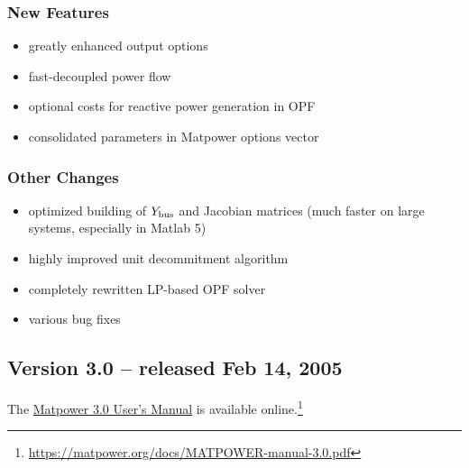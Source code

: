 \documentclass[12pt]{article}
\newcommand{\matlab}[0]{{\sc Matlab}}
\newcommand{\matpower}[0]{{\sc Matpower}}
\numberwithin{equation}{section}
\numberwithin{table}{section}
\numberwithin{figure}{section}
\begin{document}
\begin{appendices}
\subsubsection*{New Features}
\begin{itemize}
\item greatly enhanced output options
\item fast-decoupled power flow
\item optional costs for reactive power generation in OPF
\item consolidated parameters in \matpower{} options vector
\end{itemize}

\subsubsection*{Other Changes}
\begin{itemize}
\item optimized building of $Y_{\rm bus}$ and Jacobian matrices (much faster on large systems, especially in \matlab{} 5)
\item highly improved unit decommitment algorithm
\item completely rewritten LP-based OPF solver
\item various bug fixes
\end{itemize}

\clearpage
\subsection{Version 3.0 -- released Feb 14, 2005}
\label{app:v30}

The \href{https://matpower.org/docs/MATPOWER-manual-3.0.pdf}{\matpower{} 3.0 User's Manual} is available online.\footnote{\url{https://matpower.org/docs/MATPOWER-manual-3.0.pdf}}


\end{appendices}
\end{document}
